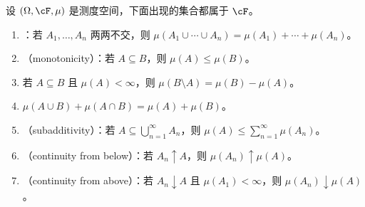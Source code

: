
\begin{theorem}[测度的基本性质]\label{thm:measures:basic}
设 $(\Omega,\cF,\mu)$ 是测度空间，下面出现的集合都属于 $\cF$。
\begin{enumerate}
\item {}：若 $A_1,\dots,A_n$ 两两不交，则 $\mu(A_1\cup\cdots\cup A_n)=\mu(A_1)+\cdots+\mu(A_n)$。
\item {}（monotonicity）：若 $A\subseteq B$，则 $\mu(A)\leqslant\mu(B)$。
\item 若 $A\subseteq B$ 且 $\mu(A)<\infty$，则 $\mu(B\setminus A)=\mu(B)-\mu(A)$。
\item $\mu(A\cup B)+\mu(A\cap B)=\mu(A)+\mu(B)$。
\item {}（subadditivity）：若 $A\subseteq\bigcup_{n=1}^\infty A_n$，则 $\mu(A)\leqslant\sum_{n=1}^\infty\mu(A_n)$。
\item {}（continuity from below）：若 $A_n\uparrow A$，则 $\mu(A_n)\uparrow\mu(A)$。
\item {}（continuity from above）：若 $A_n\downarrow A$ 且 $\mu(A_1)<\infty$，则 $\mu(A_n)\downarrow\mu(A)$。
\end{enumerate}
\end{theorem}
